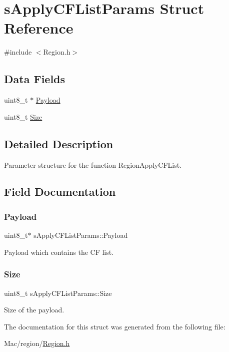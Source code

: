 \hypertarget{structsApplyCFListParams}{}\section{s\+Apply\+C\+F\+List\+Params Struct Reference}
\label{structsApplyCFListParams}


{\ttfamily \#include $<$Region.\+h$>$}

\subsection*{Data Fields}
\begin{DoxyCompactItemize}
\item 
uint8\+\_\+t $\ast$ \hyperlink{structsApplyCFListParams_a2e3665f7f1ceadab86db7e97040f5c80}{Payload}
\item 
uint8\+\_\+t \hyperlink{structsApplyCFListParams_a145a317c7c8ed36a4839c7d50b5a978f}{Size}
\end{DoxyCompactItemize}


\subsection{Detailed Description}
Parameter structure for the function Region\+Apply\+C\+F\+List. 

\subsection{Field Documentation}
\mbox{\label{structsApplyCFListParams_a2e3665f7f1ceadab86db7e97040f5c80}} 
\subsubsection{\texorpdfstring{Payload}{Payload}}
{\footnotesize\ttfamily uint8\+\_\+t$\ast$ s\+Apply\+C\+F\+List\+Params\+::\+Payload}

Payload which contains the CF list. \mbox{\label{structsApplyCFListParams_a145a317c7c8ed36a4839c7d50b5a978f}} 
\subsubsection{\texorpdfstring{Size}{Size}}
{\footnotesize\ttfamily uint8\+\_\+t s\+Apply\+C\+F\+List\+Params\+::\+Size}

Size of the payload. 

The documentation for this struct was generated from the following file\+:\begin{DoxyCompactItemize}
\item 
Mac/region/\hyperlink{Region_8h}{Region.\+h}\end{DoxyCompactItemize}
